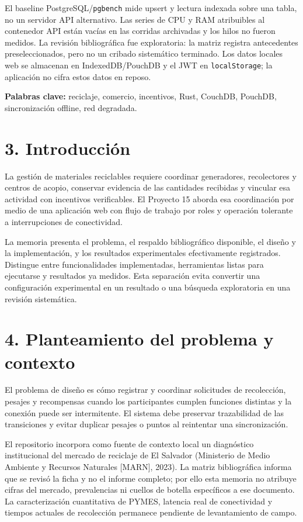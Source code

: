 \documentclass[
  spanish,
  12pt,
  a4paper,
]{article}
\begin{document}
El baseline PostgreSQL/\texttt{pgbench} mide upsert y lectura indexada
sobre una tabla, no un servidor API alternativo. Las series de CPU y RAM
atribuibles al contenedor API están vacías en las corridas archivadas y
los hilos no fueron medidos. La revisión bibliográfica fue exploratoria:
la matriz registra antecedentes preseleccionados, pero no un cribado
sistemático terminado. Los datos locales web se almacenan en
IndexedDB/PouchDB y el JWT en \texttt{localStorage}; la aplicación no
cifra estos datos en reposo.

\textbf{Palabras clave:} reciclaje, comercio, incentivos, Rust, CouchDB,
PouchDB, sincronización offline, red degradada.

\section{3. Introducción}\label{introducciuxf3n}

La gestión de materiales reciclables requiere coordinar generadores,
recolectores y centros de acopio, conservar evidencia de las cantidades
recibidas y vincular esa actividad con incentivos verificables. El
Proyecto 15 aborda esa coordinación por medio de una aplicación web con
flujo de trabajo por roles y operación tolerante a interrupciones de
conectividad.

La memoria presenta el problema, el respaldo bibliográfico disponible,
el diseño y la implementación, y los resultados experimentales
efectivamente registrados. Distingue entre funcionalidades
implementadas, herramientas listas para ejecutarse y resultados ya
medidos. Esta separación evita convertir una configuración experimental
en un resultado o una búsqueda exploratoria en una revisión sistemática.

\section{4. Planteamiento del problema y
contexto}\label{planteamiento-del-problema-y-contexto}

El problema de diseño es cómo registrar y coordinar solicitudes de
recolección, pesajes y recompensas cuando los participantes cumplen
funciones distintas y la conexión puede ser intermitente. El sistema
debe preservar trazabilidad de las transiciones y evitar duplicar
pesajes o puntos al reintentar una sincronización.

El repositorio incorpora como fuente de contexto local un diagnóstico
institucional del mercado de reciclaje de El Salvador (Ministerio de
Medio Ambiente y Recursos Naturales {[}MARN{]}, 2023). La matriz
bibliográfica informa que se revisó la ficha y no el informe completo;
por ello esta memoria no atribuye cifras del mercado, prevalencias ni
cuellos de botella específicos a ese documento. La caracterización
cuantitativa de PYMES, latencia real de conectividad y tiempos actuales
de recolección permanece pendiente de levantamiento de campo.
\end{document}
